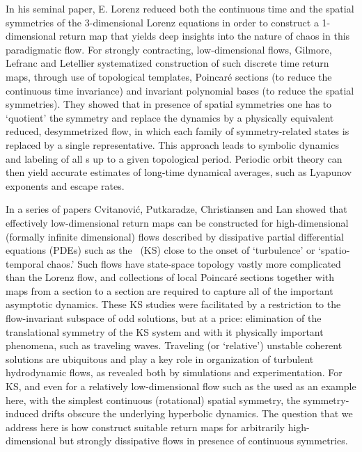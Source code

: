%
In his seminal paper, E. Lorenz reduced both
the continuous time and the spatial symmetries of the
3-dimensional Lorenz equations in order to construct a
1-dimensional return map that yields deep
insights into the nature of chaos in this
paradigmatic flow. For strongly contracting, 
low-dimensional flows, Gilmore, Lefranc and
Letellier systematized
construction of such discrete time return maps, through use
of topological templates, Poincar\'e sections (to reduce the
continuous time invariance) and invariant polynomial bases
(to reduce the spatial symmetries). They showed that in
presence of spatial symmetries one has to  `quotient' the
symmetry and replace the dynamics by a physically equivalent
reduced, desymmetrized flow, in which each family of
symmetry-related states is replaced by a single
representative. This approach leads to symbolic dynamics
and labeling of all \po s up to a given topological period.
Periodic orbit theory can then yield accurate estimates
of long-time dynamical averages, such as Lyapunov exponents
and escape rates.

In a series of papers Cvitanovi\'{c}, Putkaradze,
Christiansen and Lan%
showed that effectively low-dimensional return maps can
be constructed for high-dimensional (formally infinite
dimensional)  flows described by dissipative partial differential
equations (PDEs) such as the \KSe\ (KS) close to the onset of
`turbulence' or `spatio-temporal chaos.' Such flows have
state-space topology vastly more complicated than the Lorenz
flow, and collections of local Poincar\'e sections together
with maps from a section to a section are required to capture all
of the important asymptotic dynamics.
These KS studies were facilitated by a restriction to the
flow-invariant subspace of odd solutions, but at a price:
elimination of the translational symmetry of the KS system
and with it physically important phenomena, such as traveling
waves. Traveling (or `relative') unstable coherent solutions
are ubiquitous and play a key role in organization of
turbulent hydrodynamic flows, as revealed both by
simulations and
experimentation.
For KS, and even for a relatively
low-dimensional flow such as the
\cLe{} used as an example here, with
the simplest  continuous (rotational) spatial 
symmetry, the symmetry-induced drifts obscure the underlying
hyperbolic dynamics. The question that we address here is how
 construct suitable return maps for arbitrarily
high-dimensional but strongly dissipative flows in
presence of continuous symmetries.

